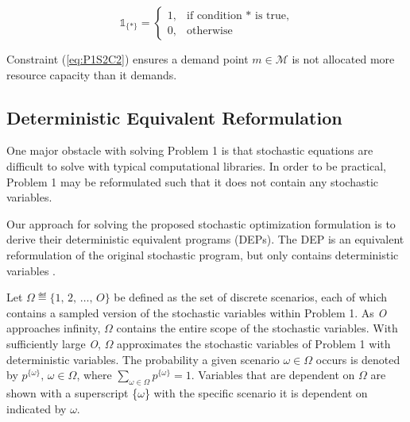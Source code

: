 \documentclass[onecolumn,draftcls]{IEEEtran}
\begin{document}
\[ \mathbb{1}_{\{*\}} =
	\begin{cases}
		1,& \text{if condition $*$ is true,}\\
		0,& \text{otherwise}
	\end{cases}
\]

Constraint (\ref{eq:P1S2C2}) ensures a demand point $m \in \mathcal{M}$ is not allocated more resource capacity than it demands.



\subsection{Deterministic Equivalent Reformulation} \label{subsec:dep}


One major obstacle with solving Problem 1 is that stochastic equations are difficult to solve with typical computational libraries.  In order to be practical, Problem 1 may be reformulated such that it does not contain any stochastic variables.

Our approach for solving the proposed stochastic optimization formulation is to derive their deterministic equivalent programs (DEPs).  The DEP is an equivalent reformulation of the original stochastic program, but only contains deterministic variables \cite{stochprogramming}.

Let $ \Omega \eqdef \{1,\, 2,\, \ldots,\, O\} $ be defined as the set of discrete scenarios, each of which contains a sampled version of the stochastic variables within Problem 1.  As \textit{O} approaches infinity, $\Omega$ contains the entire scope of the stochastic variables.  With sufficiently large \textit{O}, $\Omega$ approximates the stochastic variables of Problem 1 with deterministic variables.  The probability a given scenario $\omega \in \Omega$ occurs is denoted by $p^{\{\omega\}},\, \omega \in \Omega$, where $\sum_{\omega \in \Omega} p^{\{\omega\}} = 1$.  Variables that are dependent on $\Omega$ are shown with a superscript \{$\omega$\} with the specific scenario it is dependent on indicated by $\omega$.
\end{document}
